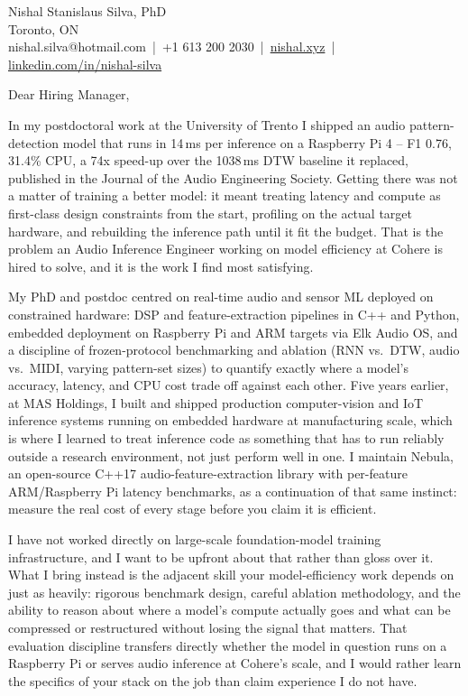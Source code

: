 \documentclass[11pt]{article}
\begin{document}
\pagestyle{empty}

\noindent Nishal Stanislaus Silva, PhD \\
Toronto, ON \\
nishal.silva@hotmail.com \,|\, +1 613 200 2030 \,|\, \href{https://nishal.xyz}{nishal.xyz} \,|\, \href{https://www.linkedin.com/in/nishal-silva}{linkedin.com/in/nishal-silva}

\vspace{1em}
\noindent Dear Hiring Manager,

\vspace{0.5em}
\noindent In my postdoctoral work at the University of Trento I shipped an audio pattern-detection model that runs in 14\,ms per inference on a Raspberry Pi 4 -- F1 0.76, 31.4\% CPU, a 74x speed-up over the 1038\,ms DTW baseline it replaced, published in the Journal of the Audio Engineering Society. Getting there was not a matter of training a better model: it meant treating latency and compute as first-class design constraints from the start, profiling on the actual target hardware, and rebuilding the inference path until it fit the budget. That is the problem an Audio Inference Engineer working on model efficiency at Cohere is hired to solve, and it is the work I find most satisfying.

\vspace{0.5em}
\noindent My PhD and postdoc centred on real-time audio and sensor ML deployed on constrained hardware: DSP and feature-extraction pipelines in C++ and Python, embedded deployment on Raspberry Pi and ARM targets via Elk Audio OS, and a discipline of frozen-protocol benchmarking and ablation (RNN vs.\ DTW, audio vs.\ MIDI, varying pattern-set sizes) to quantify exactly where a model's accuracy, latency, and CPU cost trade off against each other. Five years earlier, at MAS Holdings, I built and shipped production computer-vision and IoT inference systems running on embedded hardware at manufacturing scale, which is where I learned to treat inference code as something that has to run reliably outside a research environment, not just perform well in one. I maintain Nebula, an open-source C++17 audio-feature-extraction library with per-feature ARM/Raspberry Pi latency benchmarks, as a continuation of that same instinct: measure the real cost of every stage before you claim it is efficient.

\vspace{0.5em}
\noindent I have not worked directly on large-scale foundation-model training infrastructure, and I want to be upfront about that rather than gloss over it. What I bring instead is the adjacent skill your model-efficiency work depends on just as heavily: rigorous benchmark design, careful ablation methodology, and the ability to reason about where a model's compute actually goes and what can be compressed or restructured without losing the signal that matters. That evaluation discipline transfers directly whether the model in question runs on a Raspberry Pi or serves audio inference at Cohere's scale, and I would rather learn the specifics of your stack on the job than claim experience I do not have.
\end{document}
